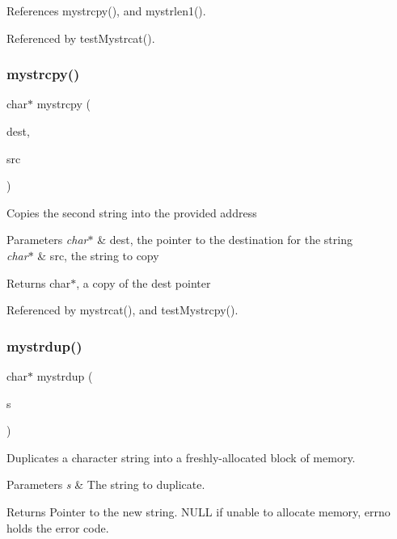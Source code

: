 References mystrcpy(), and mystrlen1().



Referenced by test\+Mystrcat().

\mbox{\label{mystring_8h_acce8ca34ad672c764b2817e5f91707d6}} 
\subsubsection{mystrcpy()}
{\footnotesize\ttfamily char$\ast$ mystrcpy (\begin{DoxyParamCaption}\item[{char $\ast$}]{dest,  }\item[{char $\ast$}]{src }\end{DoxyParamCaption})}

Copies the second string into the provided address 
\begin{DoxyParams}{Parameters}
{\em char$\ast$} & dest, the pointer to the destination for the string \\
\hline
{\em char$\ast$} & src, the string to copy \\
\hline
\end{DoxyParams}
\begin{DoxyReturn}{Returns}
char$\ast$, a copy of the dest pointer 
\end{DoxyReturn}


Referenced by mystrcat(), and test\+Mystrcpy().

\mbox{\label{mystring_8h_afd0ffd16b17423165bbba7ccadac9375}} 
\subsubsection{mystrdup()}
{\footnotesize\ttfamily char$\ast$ mystrdup (\begin{DoxyParamCaption}\item[{char $\ast$}]{s }\end{DoxyParamCaption})}

Duplicates a character string into a freshly-\/allocated block of memory. 
\begin{DoxyParams}{Parameters}
{\em s} & The string to duplicate. \\
\hline
\end{DoxyParams}
\begin{DoxyReturn}{Returns}
Pointer to the new string. N\+U\+LL if unable to allocate memory, errno holds the error code. 
\end{DoxyReturn}


